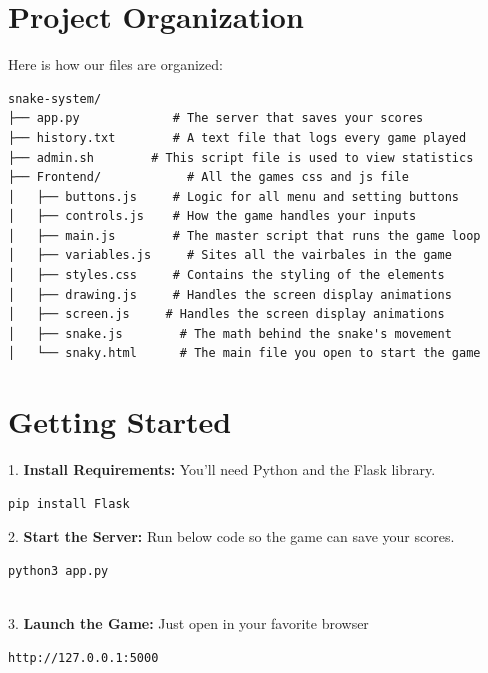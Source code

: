 \section{Project Organization}
Here is how our files are organized:
\begin{lstlisting}
snake-system/
├── app.py             # The server that saves your scores
├── history.txt        # A text file that logs every game played 
├── admin.sh        # This script file is used to view statistics
├── Frontend/            # All the games css and js file
│   ├── buttons.js     # Logic for all menu and setting buttons 
│   ├── controls.js    # How the game handles your inputs 
│   ├── main.js        # The master script that runs the game loop 
│   ├── variables.js     # Sites all the vairbales in the game
│   ├── styles.css     # Contains the styling of the elements 
│   ├── drawing.js     # Handles the screen display animations  
│   ├── screen.js     # Handles the screen display animations 
│   ├── snake.js        # The math behind the snake's movement 
│   └── snaky.html      # The main file you open to start the game 
\end{lstlisting}

\section{Getting Started}
1. \textbf{Install Requirements:} You'll need Python and the Flask library.
\begin{lstlisting} 
pip install Flask  
\end{lstlisting}
2. \textbf{Start the Server:} Run below code so the game can save your scores. \begin{lstlisting} 
python3 app.py 
\end{lstlisting} \\
3. \textbf{Launch the Game:} Just open in your favorite browser
\begin{lstlisting}
http://127.0.0.1:5000
\end{lstlisting} 

